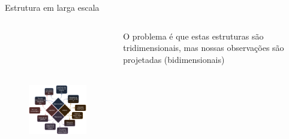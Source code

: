 \begin{frame}[c]{Estrutura em larga escala}
    \begin{columns}[c]
        \begin{column}{0.56\textwidth}
            \begin{figure}
                \centering
                \includegraphics[height=7cm]{images/LSS.png}
            \end{figure}
        \end{column}
        \begin{column}{0.36\textwidth}
            \begin{splusbox}{}
                O problema é que estas estruturas são tridimensionais, mas nossas observações são projetadas (bidimensionais)
            \end{splusbox}
        \end{column}
    \end{columns}
\end{frame}



